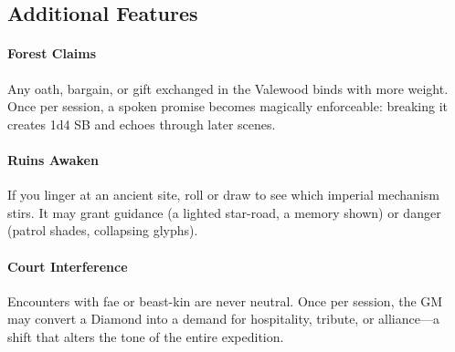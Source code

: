 \subsection*{Additional Features}
\label{sec:valewood-features}

\paragraph{Forest Claims}
Any oath, bargain, or gift exchanged in the Valewood binds with more weight. Once per session, a spoken promise becomes magically enforceable: breaking it creates 1d4 SB and echoes through later scenes.

\paragraph{Ruins Awaken}
If you linger at an ancient site, roll or draw to see which imperial mechanism stirs. It may grant guidance (a lighted star-road, a memory shown) or danger (patrol shades, collapsing glyphs).

\paragraph{Court Interference}
Encounters with fae or beast-kin are never neutral. Once per session, the GM may convert a Diamond into a demand for hospitality, tribute, or alliance---a shift that alters the tone of the entire expedition.